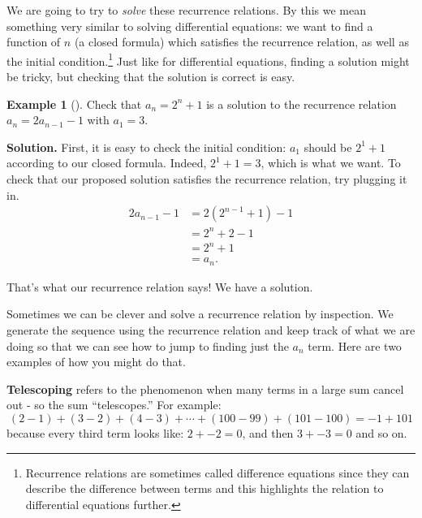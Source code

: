 \documentclass[12pt,]{book}
\newcommand{\terminology}[1]{\textbf{#1}}
\theoremstyle{plain}
\theoremstyle{definition}
\theoremstyle{definition}
\newtheorem{example}[theorem]{Example}
\theoremstyle{definition}
\numberwithin{equation}{chapter}
\newcommand{\amp}{&}
\begin{document}
\hypertarget{p-291}{}%
We are going to try to \emph{solve} these recurrence relations. By this we mean something very similar to solving differential equations: we want to find a function of \(n\) (a closed formula) which satisfies the recurrence relation, as well as the initial condition.\footnote{Recurrence relations are sometimes called difference equations since they can describe the difference between terms and this highlights the relation to differential equations further.\label{fn-2}} Just like for differential equations, finding a solution might be tricky, but checking that the solution is correct is easy.%
\begin{example}[]\label{example-19}
\hypertarget{p-292}{}%
Check that \(a_n = 2^n + 1\) is a solution to the recurrence relation \(a_n = 2a_{n-1} - 1\) with \(a_1 = 3\).%
\par\smallskip%
\noindent\textbf{Solution.}\hypertarget{solution-33}{}\quad%
\hypertarget{p-293}{}%
First, it is easy to check the initial condition: \(a_1\) should be \(2^1 + 1\) according to our closed formula. Indeed, \(2^1 + 1 = 3\), which is what we want. To check that our proposed solution satisfies the recurrence relation, try plugging it in.%
\begin{align*}
2a_{n-1} - 1 \amp = 2(2^{n-1} + 1) - 1 \\
\amp = 2^n + 2 - 1 \\
\amp = 2^n +1\\
\amp = a_n.
\end{align*}
%
\par
\hypertarget{p-294}{}%
That's what our recurrence relation says! We have a solution.%
\end{example}
\hypertarget{p-295}{}%
Sometimes we can be clever and solve a recurrence relation by inspection. We generate the sequence using the recurrence relation and keep track of what we are doing so that we can see how to jump to finding just the \(a_n\) term. Here are two examples of how you might do that.%
\par
\hypertarget{p-296}{}%
\terminology{Telescoping} refers to the phenomenon when many terms in a large sum cancel out - so the sum ``telescopes.'' For example:%
\begin{equation*}
(2 - 1) + (3 - 2) + (4 - 3) + \cdots + (100 - 99) + (101 - 100) = -1 + 101
\end{equation*}
because every third term looks like: \(2 + -2 = 0\), and then \(3 + -3 = 0\) and so on.%
\par
\hypertarget{p-297}{}%
\end{document}
